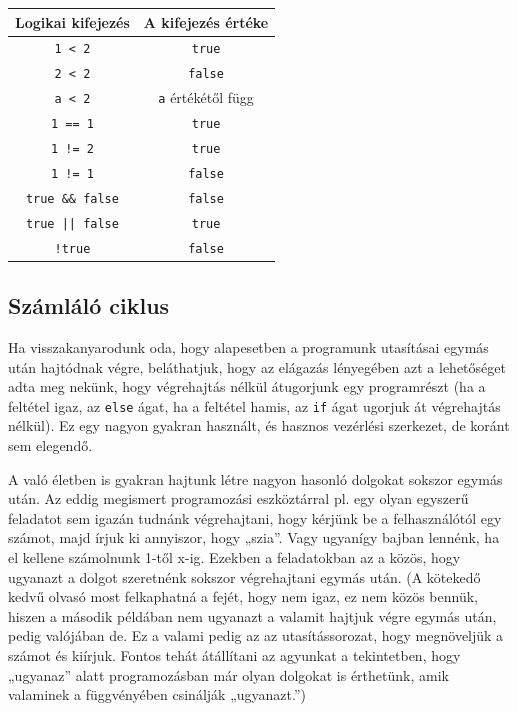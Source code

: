 \documentclass[a4paper]{article}
\begin{document}
	\begin{center}
		\begin{tabular}{||c | c||} 
			\hline
			Logikai kifejezés & A kifejezés értéke \\ %
			\hline\hline
			\lstinline[]$1 < 2$ & \lstinline[]$true$ \\
			\hline
			\lstinline[]$2 < 2$ & \lstinline[]$false$ \\
			\hline
			\lstinline[]$a < 2$ & \lstinline[]$a$ értékétől függ \\
			\hline
			\lstinline[]$1 == 1$ & \lstinline[]$true$ \\
			\hline
			\lstinline[]$1 != 2$ & \lstinline[]$true$ \\
			\hline
			\lstinline[]$1 != 1$ & \lstinline[]$false$ \\
			\hline
			\lstinline[]$true && false$ & \lstinline[]$false$ \\
			\hline
			\lstinline[]$true || false$ & \lstinline[]$true$ \\
			\hline
			\lstinline[]$!true$ & \lstinline[]$false$ \\
			\hline
		\end{tabular}
	\end{center}
	
	\subsection{Számláló ciklus}
	Ha visszakanyarodunk oda, hogy alapesetben a programunk utasításai egymás után hajtódnak végre, beláthatjuk, hogy az elágazás lényegében azt a lehetőséget adta meg nekünk, hogy végrehajtás nélkül átugorjunk egy programrészt (ha a feltétel igaz, az \lstinline{else} ágat, ha a feltétel hamis, az \lstinline{if} ágat ugorjuk át végrehajtás nélkül). Ez egy nagyon gyakran használt, és hasznos vezérlési szerkezet, de koránt sem elegendő.
	
	A való életben is gyakran hajtunk létre nagyon hasonló dolgokat sokszor egymás után. Az eddig megismert programozási eszköztárral pl. egy olyan egyszerű feladatot sem igazán tudnánk végrehajtani, hogy kérjünk be a felhasználótól egy számot, majd írjuk ki annyiszor, hogy „szia”. Vagy ugyanígy bajban lennénk, ha el kellene számolnunk 1-től x-ig. Ezekben a feladatokban az a közös, hogy ugyanazt a dolgot szeretnénk sokszor végrehajtani egymás után. (A kötekedő kedvű olvasó most felkaphatná a fejét, hogy nem igaz, ez nem közös bennük, hiszen a második példában nem ugyanazt a valamit hajtjuk végre egymás után, pedig valójában de. Ez a valami pedig az az utasítássorozat, hogy megnöveljük a számot és kiírjuk. Fontos tehát átállítani az agyunkat a tekintetben, hogy „ugyanaz” alatt programozásban már olyan dolgokat is érthetünk, amik valaminek a függvényében csinálják „ugyanazt.”)
	
\end{document}

